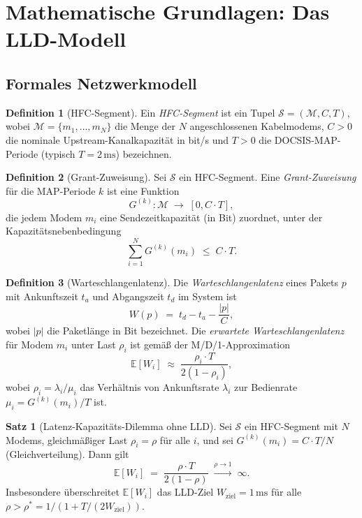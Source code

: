 ﻿\documentclass[a4paper,12pt]{article}
\theoremstyle{definition}
\newtheorem{definition}{Definition}
\newtheorem{satz}{Satz}
\begin{document}
\section{Mathematische Grundlagen: Das LLD-Modell}

\subsection{Formales Netzwerkmodell}

\begin{definition}[HFC-Segment]
    Ein \emph{HFC-Segment} ist ein Tupel $\mathcal{S} = (\mathcal{M}, C, T)$,
    wobei $\mathcal{M} = \{m_1, \dots, m_N\}$ die Menge der $N$ angeschlossenen
    Kabelmodems, $C > 0$ die nominale Upstream-Kanalkapazit\"{a}t in bit/s und
    $T > 0$ die DOCSIS-MAP-Periode (typisch $T = 2\,\mathrm{ms}$) bezeichnen.
\end{definition}

\begin{definition}[Grant-Zuweisung]
    Sei $\mathcal{S}$ ein HFC-Segment. Eine \emph{Grant-Zuweisung} f\"{u}r die
    MAP-Periode $k$ ist eine Funktion
    \[
        G^{(k)}: \mathcal{M} \;\longrightarrow\; [0, C \cdot T],
    \]
    die jedem Modem $m_i$ eine Sendezeitkapazit\"{a}t (in Bit) zuordnet, unter der
    Kapazit\"{a}tsnebenbedingung
    \[
        \sum_{i=1}^{N} G^{(k)}(m_i) \;\leq\; C \cdot T.
    \]
\end{definition}

\begin{definition}[Warteschlangenlatenz]
    Die \emph{Warteschlangenlatenz} eines Pakets $p$ mit Ankunftszeit $t_a$
    und Abgangszeit $t_d$ im System ist
    \[
        W(p) \;=\; t_d - t_a - \frac{|p|}{C},
    \]
    wobei $|p|$ die Paketl\"{a}nge in Bit bezeichnet. Die
    \emph{erwartete Warteschlangenlatenz} f\"{u}r Modem $m_i$ unter Last $\rho_i$
    ist gem\"{a}{\ss} der M/D/1-Approximation
    \[
        \mathbb{E}[W_i] \;\approx\; \frac{\rho_i \cdot T}{2(1 - \rho_i)},
    \]
    wobei $\rho_i = \lambda_i / \mu_i$ das Verh\"{a}ltnis von Ankunftsrate $\lambda_i$
    zur Bedienrate $\mu_i = G^{(k)}(m_i)/T$ ist.
\end{definition}

\begin{satz}[Latenz-Kapazit\"{a}ts-Dilemma ohne LLD]
    \label{satz:dilemma}
    Sei $\mathcal{S}$ ein HFC-Segment mit $N$ Modems, gleichm\"{a}{\ss}iger Last
    $\rho_i = \rho$ f\"{u}r alle $i$, und sei $G^{(k)}(m_i) = C \cdot T / N$
    (Gleichverteilung). Dann gilt
    \[
        \mathbb{E}[W_i] \;=\; \frac{\rho \cdot T}{2(1 - \rho)} \;\xrightarrow{\rho \to 1}\; \infty.
    \]
    Insbesondere \"{u}berschreitet $\mathbb{E}[W_i]$ das LLD-Ziel $W_{\mathrm{ziel}} = 1\,\mathrm{ms}$
    f\"{u}r alle $\rho > \rho^* = 1 / (1 + T / (2 W_{\mathrm{ziel}}))$.
\end{satz}
\end{document}
